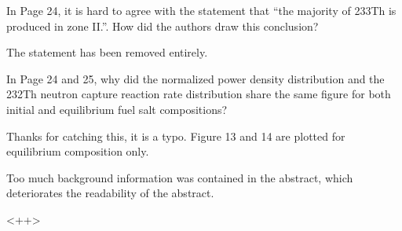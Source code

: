 \documentclass[answers,11pt]{exam}
\begin{document}
\begin{questions}
\begin{solution}
        \end{solution}

        \question  In Page 24, it is hard to agree with the statement that ``the 
        majority of 233Th is produced in zone II.''. How did the authors draw 
        this conclusion?
        \begin{solution}
                The statement has been removed entirely.
        \end{solution}

        \question  In Page 24 and 25, why did the normalized power density 
        distribution and the 232Th neutron capture reaction rate distribution 
        share the same figure for both initial and equilibrium fuel salt 
        compositions?
        \begin{solution}
                Thanks for catching this, it is a typo. Figure 13 and 14 are plotted 
                for equilibrium composition only.            	    
        \end{solution}

        \question  Too much background information was contained in the 
        abstract, which deteriorates the readability of the abstract.
        \begin{solution}
                <++>
        \end{solution}

\end{questions}


\end{document}
